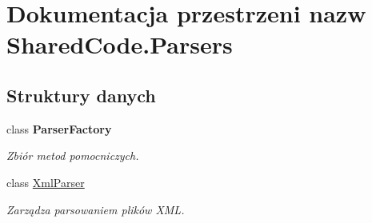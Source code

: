 \hypertarget{a00310}{}\section{Dokumentacja przestrzeni nazw Shared\+Code.\+Parsers}
\label{a00310}
\subsection*{Struktury danych}
\begin{DoxyCompactItemize}
\item 
class {\bfseries Parser\+Factory}
\begin{DoxyCompactList}\small\item\em Zbiór metod pomocniczych. \end{DoxyCompactList}\item 
class \hyperlink{a00090}{Xml\+Parser}
\begin{DoxyCompactList}\small\item\em Zarządza parsowaniem plików X\+M\+L. \end{DoxyCompactList}\end{DoxyCompactItemize}
